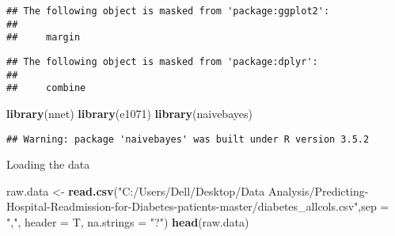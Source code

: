 \documentclass[]{article}
\newenvironment{Shaded}{\begin{snugshade}}{\end{snugshade}}
\newcommand{\KeywordTok}[1]{\textcolor[rgb]{0.13,0.29,0.53}{\textbf{#1}}}
\newcommand{\DataTypeTok}[1]{\textcolor[rgb]{0.13,0.29,0.53}{#1}}
\newcommand{\StringTok}[1]{\textcolor[rgb]{0.31,0.60,0.02}{#1}}
\newcommand{\NormalTok}[1]{#1}
\begin{document}
\begin{verbatim}
## The following object is masked from 'package:ggplot2':
## 
##     margin
\end{verbatim}

\begin{verbatim}
## The following object is masked from 'package:dplyr':
## 
##     combine
\end{verbatim}

\begin{Shaded}
\begin{Highlighting}[]
\KeywordTok{library}\NormalTok{(nnet)}
\KeywordTok{library}\NormalTok{(e1071)}
\KeywordTok{library}\NormalTok{(naivebayes)}
\end{Highlighting}
\end{Shaded}

\begin{verbatim}
## Warning: package 'naivebayes' was built under R version 3.5.2
\end{verbatim}

Loading the data

\begin{Shaded}
\begin{Highlighting}[]
\NormalTok{raw.data <-}\StringTok{ }\KeywordTok{read.csv}\NormalTok{(}\StringTok{"C:/Users/Dell/Desktop/Data Analysis/Predicting-Hospital-Readmission-for-Diabetes-patients-master/diabetes_allcols.csv"}\NormalTok{,}\DataTypeTok{sep =} \StringTok{","}\NormalTok{, }\DataTypeTok{header =}\NormalTok{ T, }\DataTypeTok{na.strings =} \StringTok{"?"}\NormalTok{)}
\KeywordTok{head}\NormalTok{(raw.data)}
\end{Highlighting}
\end{Shaded}
\end{document}
